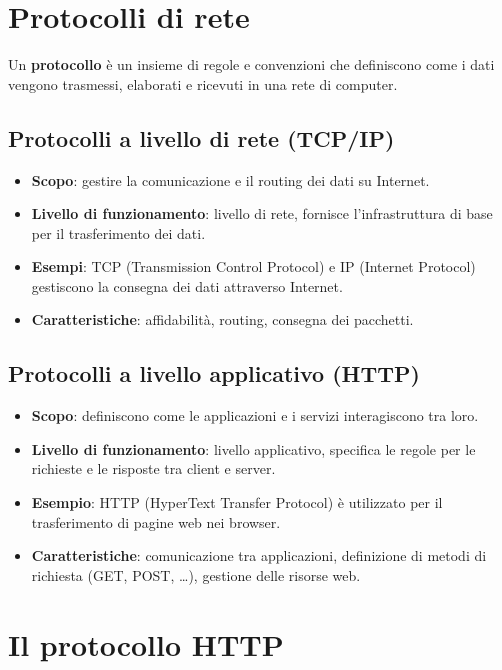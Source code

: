 \section{Protocolli di rete}

Un \textbf{protocollo} è un insieme di regole e convenzioni che definiscono come i dati vengono trasmessi, elaborati e ricevuti in una rete di computer.

\subsection{Protocolli a livello di rete (TCP/IP)}

\begin{itemize}
    \item \textbf{Scopo}: gestire la comunicazione e il routing dei dati su Internet.
    \item \textbf{Livello di funzionamento}: livello di rete, fornisce l'infrastruttura di base per il trasferimento dei dati.
    \item \textbf{Esempi}: TCP (Transmission Control Protocol) e IP (Internet Protocol) gestiscono la consegna dei dati attraverso Internet.
    \item \textbf{Caratteristiche}: affidabilità, routing, consegna dei pacchetti.
\end{itemize}

\subsection{Protocolli a livello applicativo (HTTP)}

\begin{itemize}
    \item \textbf{Scopo}: definiscono come le applicazioni e i servizi interagiscono tra loro.
    \item \textbf{Livello di funzionamento}: livello applicativo, specifica le regole per le richieste e le risposte tra client e server.
    \item \textbf{Esempio}: HTTP (HyperText Transfer Protocol) è utilizzato per il trasferimento di pagine web nei browser.
    \item \textbf{Caratteristiche}: comunicazione tra applicazioni, definizione di metodi di richiesta (GET, POST, \dots), gestione delle risorse web.
\end{itemize}

\section{Il protocollo HTTP}

